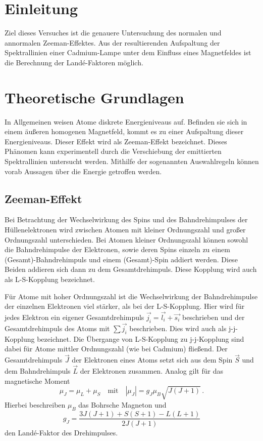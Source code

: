 \section{Einleitung}
Ziel dieses Versuches ist die genauere Untersuchung des normalen und annormalen Zeeman-Effektes.
Aus der resultierenden Aufspaltung der Spektrallinien einer Cadmium-Lampe unter dem Einfluss eines Magnetfeldes ist die Berechnung der Landé-Faktoren möglich. \\

\section{Theoretische Grundlagen}
In Allgemeinen weisen Atome diskrete Energieniveaus auf. Befinden sie sich in einem äußeren homogenen
Magnetfeld, kommt es zu einer Aufspaltung dieser Energieniveaus. Dieser Effekt wird als Zeeman-Effekt
bezeichnet. Dieses Phänomen kann experimentell durch die Verschiebung der emittierten Spektrallinien
untersucht werden. Mithilfe der sogenannten Auswahlregeln können vorab Aussagen über die
Energie getroffen werden.

\subsection{Zeeman-Effekt}
Bei Betrachtung der Wechselwirkung des Spins und des Bahndrehimpulses der Hüllenelektronen wird zwischen Atomen mit kleiner Ordnungszahl und großer Ordnungszahl unterschieden. Bei Atomen kleiner Ordnungszahl können sowohl die Bahndrehimpulse der Elektronen, sowie deren Spins einzeln zu einem (Gesamt)-Bahndrehimpuls und einem (Gesamt)-Spin addiert werden. Diese Beiden addieren sich dann zu dem Gesamtdrehimpuls. Diese Kopplung wird auch als L-S-Kopplung bezeichnet.\par
Für Atome mit hoher Ordnungszahl ist die Wechselwirkung der Bahndrehimpulse der einzelnen Elektronen viel stärker, als bei der L-S-Kopplung.
Hier wird für jedes Elektron ein eigener Gesamtdrehimpuls $\vec{j_i}= \vec{l_i} + \vec{s_i}$ beschrieben und der Gesamtdrehimpuls des Atoms mit $\sum \vec{j_i}$ beschrieben. Dies wird auch als j-j-Kopplung bezeichnet.
Die Übergange von L-S-Kopplung zu j-j-Kopplung sind dabei für Atome mittler Ordnungszahl (wie bei Cadmium) fließend.
Der Gesamtdrehimpuls $\vec{J}$ der Elektronen eines Atoms setzt sich aus dem Spin $\vec{S}$ und dem Bahndrehimpuls $\vec{L}$ der Elektronen zusammen.
Analog gilt für das magnetische Moment
\begin{equation*}
  \mu_J = \mu_L + \mu_S \quad \text{mit} \quad |\mu_J| = g_J \mu_B \sqrt{J (J + 1)} \, .
\end{equation*}
Hierbei beschreiben $\mu_B$ das Bohrsche Magneton und
\begin{equation}\label{eqn:Lande}
  g_J = \frac{3J(J + 1) + S(S + 1) − L(L + 1)}{2J (J + 1)}
\end{equation}
den Landé-Faktor des Drehimpulses.

